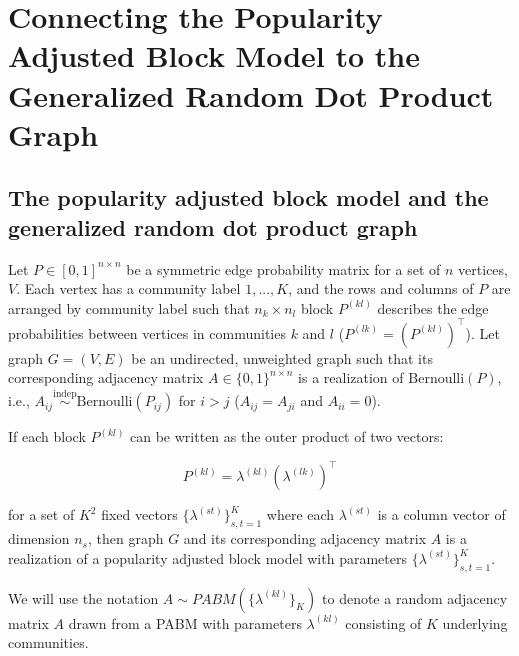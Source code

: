 \documentclass[
  12pt,
]{article}
\begin{document}
\hypertarget{connecting-the-popularity-adjusted-block-model-to-the-generalized-random-dot-product-graph}{%
\section{Connecting the Popularity Adjusted Block Model to the
Generalized Random Dot Product
Graph}\label{connecting-the-popularity-adjusted-block-model-to-the-generalized-random-dot-product-graph}}

\hypertarget{the-popularity-adjusted-block-model-and-the-generalized-random-dot-product-graph}{%
\subsection{The popularity adjusted block model and the generalized
random dot product
graph}\label{the-popularity-adjusted-block-model-and-the-generalized-random-dot-product-graph}}

\begin{definition}
\label{pabm}
Let $P \in [0, 1]^{n \times n}$ be a symmetric edge probability matrix for a 
set of $n$ 
vertices, $V$. Each vertex has a community label $1, ..., K$, and the rows and 
columns of $P$ are arranged by community label such that $n_k \times n_l$ block 
$P^{(kl)}$ describes the edge probabilities between vertices in communities 
$k$ and $l$ ($P^{(lk)} = (P^{(kl)})^\top$). 
Let graph $G = (V, E)$ be an undirected, unweighted graph such 
that its corresponding adjacency matrix $A \in \{0, 1\}^{n \times n}$ is a 
realization of $\text{Bernoulli}(P)$, i.e., 
$A_{ij} \stackrel{\text{indep}}{\sim}\text{Bernoulli}(P_{ij})$ for $i > j$ 
($A_{ij} = A_{ji}$ and $A_{ii} = 0$). 

If each block $P^{(kl)}$ can be written as the outer product of two vectors:

\begin{equation} \label{eq:pabm}
  P^{(kl)} = \lambda^{(kl)} (\lambda^{(lk)})^\top
\end{equation}

for a set of $K^2$ fixed vectors $\{\lambda^{(st)}\}_{s, t = 1}^K$ where each 
$\lambda^{(st)}$ is a column vector 
of dimension $n_s$, then graph $G$ and its corresponding adjacency matrix $A$ 
is a realization of a popularity adjusted block model with parameters 
$\{\lambda^{(st)}\}_{s, t = 1}^K$. 
\end{definition}

We will use the notation \(A \sim PABM(\{\lambda^{(kl)}\}_K)\) to denote
a random adjacency matrix \(A\) drawn from a PABM with parameters
\(\lambda^{(kl)}\) consisting of \(K\) underlying communities.
\end{document}
